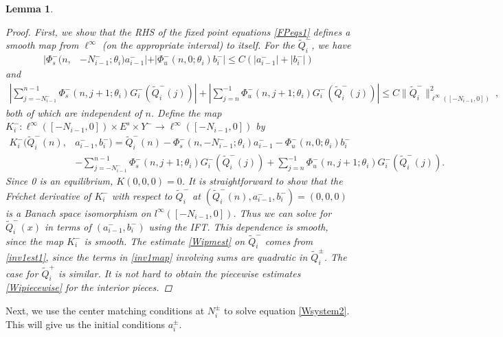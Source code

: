 \documentclass[12pt]{elsarticle}
\newtheorem{lemma}{Lemma}
\begin{document}
\begin{lemma}
\begin{proof}
First, we show that the RHS of the fixed point equations \cref{FPeqs1} defines a smooth map from $\ell^\infty$ (on the appropriate interval) to itself. For the $\tilde{Q}_i^-$, we have
\begin{align}\label{inv1est1}
|\Phi_s^-(n, &-N_{i-1}^-; \theta_i) a_{i-1}^-| + |\Phi_u^-(n, 0; \theta_i) b_i^-| \leq C ( |a_{i-1}^-| + |b_i^-|) 
\end{align}
and
\begin{align*}
\left| \sum_{j = -N_{i-1}^-}^{n-1} \Phi_s^-(n, j+1; \theta_i) G_i^-(\tilde{Q}_i^-(j))\right| + \left|\sum_{j = n}^{-1} \Phi_u^-(n, j+1; \theta_i) G_i^-(\tilde{Q}_i^-(j))\right| 
\leq C \|\tilde{Q}_i^-\|_{\ell^\infty([-N_{i-1}, 0])}^2 \:,
\end{align*}
both of which are independent of $n$. Define the map
$K_i^-: \ell^\infty([-N_{i-1}, 0]) \times E^s \times Y^- \rightarrow \ell^\infty([-N_{i-1}, 0])$ by
\begin{align}\label{inv1map}
K_i^-(\tilde{Q}_i^-(n), &a_{i-1}^-, b_i^-) = \tilde{Q}_i^-(n) - \Phi_s^-(n, -N_{i-1}^-; \theta_i) a_{i-1}^- - \Phi_u^-(n, 0; \theta_i) b_i^-  \\
&- \sum_{j = -N_{i-1}^-}^{n-1} \Phi_s^-(n, j+1; \theta_i) G_i^-(\tilde{Q}_i^-(j)) + \sum_{j = n}^{-1} \Phi_u^-(n, j+1; \theta_i) G_i^-(\tilde{Q}_i^-(j)) . \nonumber
\end{align}
Since 0 is an equilibrium, $K(0, 0, 0) = 0$. It is straightforward to show that the Fr\'echet derivative of $K_i^-$ with respect to $\tilde{Q}_i^-$ at $(\tilde{Q}_i^-(n), a_{i-1}^-, b_i^-) = (0, 0, 0)$ is a Banach space isomorphism on $l^\infty([-N_{i-1}, 0])$. Thus we can solve for $\tilde{Q}_i^-(x)$ in terms of $(a_{i-1}^-, b_i^-)$ using the IFT. This dependence is smooth, since the map $K_i^-$ is smooth. The estimate \cref{Wipmest} on $\tilde{Q}_i^-$ comes from \cref{inv1est1}, since the terms in \cref{inv1map} involving sums are quadratic in $\tilde{Q}_i^\pm$. The case for $\tilde{Q}_i^+$ is similar. It is not hard to obtain the piecewise estimates \cref{Wipiecewise} for the interior pieces.
\end{proof}
\end{lemma}

Next, we use the center matching conditions at $N_i^\pm$ to solve equation \cref{Wsystem2}. This will give us the initial conditions $a_i^\pm$.
\end{document}
